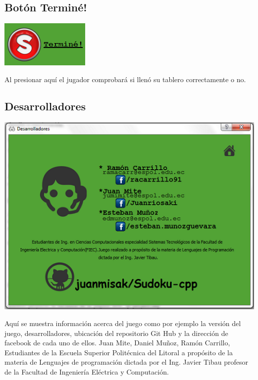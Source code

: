 \documentclass[a4paper,11pt]{article}
\begin{document}
\subsection{Botón Terminé!}
\includegraphics{termine.png}

Al presionar aquí el jugador comprobará si llenó su tablero correctamente o no.
\subsection{Desarrolladores}
\includegraphics{pagdesa.png}

Aquí se muestra información acerca del juego como por ejemplo la versión del juego, desarrolladores, ubicación del repositorio Git Hub y la dirección de facebook de cada uno de ellos.
Juan Mite, Daniel Muñoz, Ramón Carrillo, Estudiantes de la Escuela Superior Politécnica del Litoral a propósito de la materia de Lenguajes de programación dictada por el Ing. Javier Tibau profesor de la Facultad de Ingeniería Eléctrica y Computación.  
\end{document}
